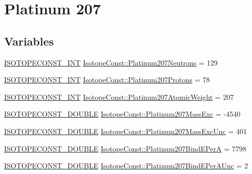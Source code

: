 \hypertarget{group___isotope_const-_platinum-_pt207}{}\section{Platinum 207}
\label{group___isotope_const-_platinum-_pt207}
\subsection*{Variables}
\begin{DoxyCompactItemize}
\item 
\mbox{\hyperlink{group___isotope_const-_macros_ga5f18360b3e99483a35c32d789e62621c}{I\+S\+O\+T\+O\+P\+E\+C\+O\+N\+S\+T\+\_\+\+I\+NT}} \mbox{\hyperlink{group___isotope_const-_platinum-_pt207_ga9bfa83021026d672b0be7d14aba1c92c}{Isotope\+Const\+::\+Platinum207\+Neutrons}} = 129
\item 
\mbox{\hyperlink{group___isotope_const-_macros_ga5f18360b3e99483a35c32d789e62621c}{I\+S\+O\+T\+O\+P\+E\+C\+O\+N\+S\+T\+\_\+\+I\+NT}} \mbox{\hyperlink{group___isotope_const-_platinum-_pt207_ga0737cb34b3e1b751a66455235df2bdfb}{Isotope\+Const\+::\+Platinum207\+Protons}} = 78
\item 
\mbox{\hyperlink{group___isotope_const-_macros_ga5f18360b3e99483a35c32d789e62621c}{I\+S\+O\+T\+O\+P\+E\+C\+O\+N\+S\+T\+\_\+\+I\+NT}} \mbox{\hyperlink{group___isotope_const-_platinum-_pt207_ga89ca2a181947d930656b6fb4dd71f2d5}{Isotope\+Const\+::\+Platinum207\+Atomic\+Weight}} = 207
\item 
\mbox{\hyperlink{group___isotope_const-_macros_ga8f45a7272ce02c0b4c65c44636ed719a}{I\+S\+O\+T\+O\+P\+E\+C\+O\+N\+S\+T\+\_\+\+D\+O\+U\+B\+LE}} \mbox{\hyperlink{group___isotope_const-_platinum-_pt207_ga3579b7a48842b27090b268aae1ef423c}{Isotope\+Const\+::\+Platinum207\+Mass\+Exc}} = -\/4540
\item 
\mbox{\hyperlink{group___isotope_const-_macros_ga8f45a7272ce02c0b4c65c44636ed719a}{I\+S\+O\+T\+O\+P\+E\+C\+O\+N\+S\+T\+\_\+\+D\+O\+U\+B\+LE}} \mbox{\hyperlink{group___isotope_const-_platinum-_pt207_gadaca33d846ce71ff479b9107394f4dfd}{Isotope\+Const\+::\+Platinum207\+Mass\+Exc\+Unc}} = 401
\item 
\mbox{\hyperlink{group___isotope_const-_macros_ga8f45a7272ce02c0b4c65c44636ed719a}{I\+S\+O\+T\+O\+P\+E\+C\+O\+N\+S\+T\+\_\+\+D\+O\+U\+B\+LE}} \mbox{\hyperlink{group___isotope_const-_platinum-_pt207_ga53363e21d866e028f3d998eb1b07a14c}{Isotope\+Const\+::\+Platinum207\+Bind\+E\+PerA}} = 7798
\item 
\mbox{\hyperlink{group___isotope_const-_macros_ga8f45a7272ce02c0b4c65c44636ed719a}{I\+S\+O\+T\+O\+P\+E\+C\+O\+N\+S\+T\+\_\+\+D\+O\+U\+B\+LE}} \mbox{\hyperlink{group___isotope_const-_platinum-_pt207_gad6f3cf58387f84b5664ef1d31aa0ddb4}{Isotope\+Const\+::\+Platinum207\+Bind\+E\+Per\+A\+Unc}} = 2

\end{DoxyCompactItemize}
